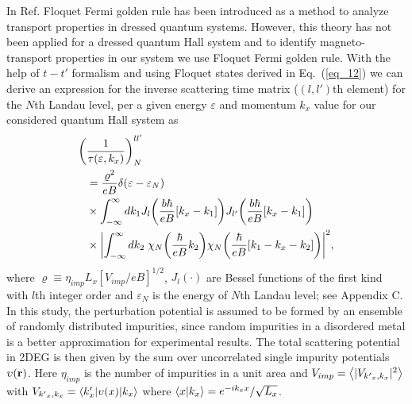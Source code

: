 
In Ref. \cite{wackerl20} Floquet Fermi golden rule has been introduced as a method to analyze transport properties in dressed quantum systems. However, this theory has not been applied for a dressed quantum Hall system and to identify magneto-transport properties in our system we use Floquet Fermi golden rule.
With the help of $t-t'$ formalism \cite{wackerl20,grifoni98,sambe75,peskin93,althorpe97} and using Floquet states derived in Eq.~(\ref{eq_12}) we can derive an  expression for the inverse scattering time matrix ($(l,l')$th element) for the $N$th Landau level, per a given energy $\varepsilon$ and momentum $k_x$ value for our considered quantum Hall system as
\begin{equation} \label{eq_13}
  \begin{aligned}
    \bigg(&\frac{1}{\tau(\varepsilon,k_x)}\bigg)^{ll'}_{N} \\
    & =
    \frac { \varrho^2}{eB}
    \delta(\varepsilon - \varepsilon_{N}) \\
    & \times
    \int_{-\infty}^{\infty} d k_1
    J_l\qty(\frac{b\hbar}{eB}[{k}_x - k_1])
    J_{l'}\qty(\frac{b\hbar}{eB}[{k}_x - k_1]) \\
    & \times
    \qty|
    \int_{-\infty}^{\infty} dk_2 \;
    {\chi}_{N}\qty(\frac{\hbar}{eB}k_2)
    {\chi}_{N}\qty(\frac{\hbar}{eB} \qty[k_1 - {k}_x - k_2])|^2,
  \end{aligned}
\end{equation}
where $\varrho \equiv \eta_{imp} L_x [ { V_{imp}}/{eB}]^{1/2}$,
$J_l(\cdot)$ are Bessel functions of the first kind with $l$th integer order and $\varepsilon_N$ is the energy of $N$th Landau level; see Appendix C. In this study, the perturbation potential is assumed to be formed by an ensemble of randomly distributed impurities, since random impurities in a disordered metal is a better approximation for experimental results. The total  scattering potential in 2DEG is then given by the sum over uncorrelated single impurity potentials $\upsilon(\vb{r})$. Here $\eta_{imp}$ is the number of impurities in a unit area and $V_{imp} = \expval{|V_{{k'}_x,k_x}|^2}$ with $V_{{k'}_x,k_x} = \mel**{k'_x}{\upsilon(x) }{k_x}$ where $\braket{x}{k_x} = e^{-ik_x x}/\sqrt{L_x}$.

